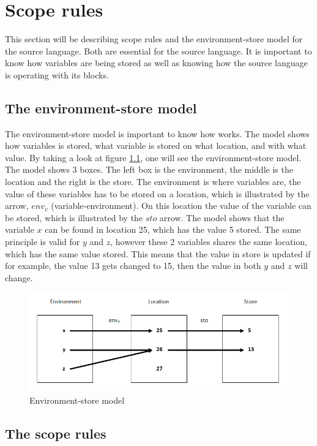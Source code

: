\chapter{Scope rules}\label{chap:scope-rules}
This section will be describing scope rules and the environment-store model for the source language. Both are essential for the source language. It is important to know how variables are being stored as well as knowing how the source language is operating with its blocks. 

\section{The environment-store model}\label{sec:es-model}
The environment-store model is important to know how works. The model shows how variables is stored, what variable is stored on what location, and with what value. By taking a look at figure \ref{fig:esmodel}, one will see the environment-store model. The model shows 3 boxes. The left box is the environment, the middle is the location and the right is the store. The environment is where variables are, the value of these variables has to be stored on a location, which is illustrated by the arrow, $env_v$ (variable-environment). On this location the value of the variable can be stored, which is illustrated by the $sto$ arrow. The model shows that the variable $x$ can be found in location 25, which has the value 5 stored. The same principle is valid for $y$ and $z$, however these 2 variables shares the same location, which has the same value stored. This means that the value in store is updated if for example, the value 13 gets changed to 15, then the value in both $y$ and $z$ will change. 
\begin{figure}[H]
\includegraphics{billeder/environment_store_model.png}
\caption{Environment-store model}
\label{fig:esmodel}
\end{figure}


\section{The scope rules}\label{sec:scope-rules}




